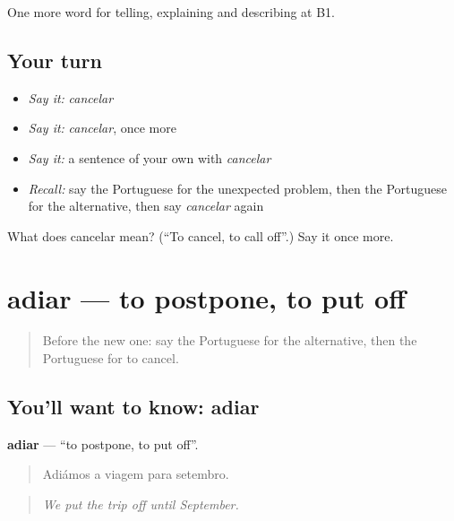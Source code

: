 \begin{grammarlens}[title={What you've built}]
One more word for telling, explaining and describing at B1.
\end{grammarlens}

\subsection*{Your turn}
\begin{itemize}
\raggedright
  \item \emph{Say it:} \emph{cancelar}
  \item \emph{Say it:} \emph{cancelar}, once more
  \item \emph{Say it:} a sentence of your own with \emph{cancelar}
  \item \emph{Recall:} say the Portuguese for the unexpected problem, then the Portuguese for the alternative, then say \emph{cancelar} again
\end{itemize}

\begin{tcolorbox}[breakable,colback=teal!4,colframe=teal!35!black,title={Before you move on}]
What does cancelar mean? (\textquotedblleft{}To cancel, to call off\textquotedblright{}.) Say it once more.
\end{tcolorbox}
\section[adiar]{adiar — to postpone, to put off}

\label{lesson:PT-C372-adiar}



\begin{quote}
Before the new one: say the Portuguese for the alternative, then the Portuguese for to cancel.
\end{quote}

\subsection*{You'll want to know: adiar}
\textbf{adiar} — \textquotedblleft{}to postpone, to put off\textquotedblright{}.

\begin{quote}
Adiámos a viagem para setembro.
\end{quote}

\begin{quote}
\emph{We put the trip off until September.}
\end{quote}

